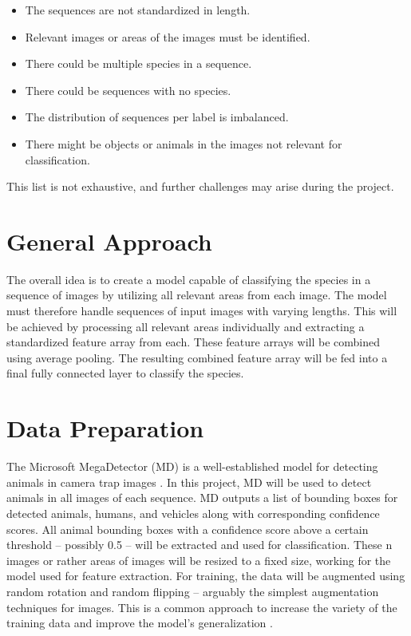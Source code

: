 \documentclass{article}
\begin{document}
\begin{itemize}
  \item The sequences are not standardized in length.
  \item Relevant images or areas of the images must be identified.
  \item There could be multiple species in a sequence.
  \item There could be sequences with no species.
  \item The distribution of sequences per label is imbalanced.
  \item There might be objects or animals in the images not relevant for classification.
\end{itemize}

This list is not exhaustive, and further challenges may arise during the project.

\section*{General Approach} %

The overall idea is to create a model capable of classifying the species in a sequence of images by utilizing all 
relevant areas from each image. The model must therefore handle sequences of input images with varying lengths.
This will be achieved by processing all relevant areas individually and extracting a standardized feature array from 
each. These feature arrays will be combined using average pooling. The resulting combined feature array
will be fed into a final fully connected layer to classify the species.

\section*{Data Preparation} %

The Microsoft MegaDetector (MD) is a well-established model for detecting animals in camera trap images 
\autocite{hernandezPytorchWildlifeCollaborativeDeep2024a, velezChoosingAppropriatePlatform2022,
schneiderRecognitionEuropeanMammals2024}. In this project, MD will be used to detect animals in all images
of each sequence. MD outputs a list of bounding boxes for detected animals, humans, and vehicles
along with corresponding confidence scores. All animal bounding boxes with a confidence score above a certain threshold 
-- possibly 0.5 -- will be extracted and used for classification. These n images or rather areas of images
will be resized to a fixed size, working for the model used for feature extraction. 
For training, the data will be augmented using random rotation 
and random flipping -- arguably the simplest augmentation techniques for images. 
This is a common approach to increase the variety of the
training data and improve the model's generalization \autocite{shortenSurveyImageData2019}.
\end{document}
